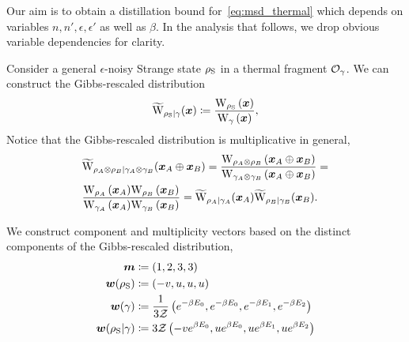 \documentclass[pra,
aps,
twocolumn,
superscriptaddress,
groupedaddress,
nofootinbib,
reprint
]{revtex4-1}
\begin{document}
Our aim is to obtain a distillation bound for~\cref{eq:msd_thermal} which depends on variables $n, n', \epsilon, \epsilon'$ as well as $\beta$.
In the analysis that follows, we drop obvious variable dependencies for clarity.

Consider a general $\epsilon$-noisy Strange state $\rho_{\rm{S}}$ in a thermal fragment $\mathcal{O}_{\gamma}$.
We can construct the Gibbs-rescaled distribution 
\begin{equation}
	\widetilde{\rm{W}}_{\rho_{\rm{S}}|\gamma}(\bmx) \coloneqq \frac{\W[\bmx]{\rho_{\rm{S}}}}{\W[\bmx]{\gamma}},
\end{equation}
Notice that the Gibbs-rescaled distribution is multiplicative in general,
\begin{align}
	&\widetilde{\rm{W}}_{\rho_A \otimes \rho_B | \gamma_A \otimes \gamma_B}(\bmx_A \oplus \bmx_B) = \frac{\W[\bmx_A \oplus \bmx_B]{\rho_A \otimes \rho_B}}{\W[\bmx_A \oplus \bmx_B]{\gamma_A \otimes \gamma_B}} = \nonumber \\
	&\frac{\W[\bmx_A]{\rho_A}\W[\bmx_B]{\rho_B}}{\W[\bmx_A]{\gamma_A}\W[\bmx_B]{\gamma_B}} = \widetilde{\rm{W}}_{\rho_A | \gamma_A}(\bmx_A)\widetilde{\rm{W}}_{\rho_B  | \gamma_B}(\bmx_B).
\end{align}

We construct component and multiplicity vectors based on the distinct components of the Gibbs-rescaled distribution,
\begin{align}
	\bm{m} &\coloneqq (1,2,3,3) \\
	\bm{w}(\rho_{\rm{S}}) &\coloneqq (-v, u, u, u) \\
	\bm{w}(\gamma) &\coloneqq \frac{1}{3\mathcal{Z}} \left( e^{-\beta E_0}, e^{-\beta E_0}, e^{-\beta E_1}, e^{-\beta E_2} \right) \\
	\bm{w}(\rho_{\rm{S}} | \gamma) &\coloneqq 3\mathcal{Z} \left( -v e^{\beta E_0}, u e^{\beta E_0}, u e^{\beta E_1}, u e^{\beta E_2} \right) \label{eq:bmw_rescaled}
\end{align}
\end{document}
